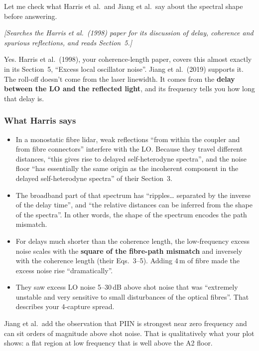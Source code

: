 \begin{tcolorbox}[breakable, colback=gray!4, colframe=gray!50,
	boxrule=0.4pt, arc=2pt, fontupper=\small,
	left=6pt, right=6pt, top=4pt, bottom=4pt]
	Let me check what Harris et al.\ and Jiang et al.\ say about the spectral shape before answering.
	
	\textit{[Searches the Harris et al.\ (1998) paper for its discussion of delay, coherence and spurious reflections, and reads Section~5.]}
	
	Yes. Harris et al.\ (1998), your coherence-length paper, covers this almost exactly in its Section~5, ``Excess local oscillator noise''. Jiang et al.\ (2019) supports it. The roll-off doesn't come from the laser linewidth. It comes from the \textbf{delay between the LO and the reflected light}, and its frequency tells you how long that delay is.
	
	\subsubsection*{What Harris says}
	\begin{itemize}
		\item In a monostatic fibre lidar, weak reflections ``from within the coupler and from fibre connectors'' interfere with the LO. Because they travel different distances, ``this gives rise to delayed self-heterodyne spectra'', and the noise floor ``has essentially the same origin as the incoherent component in the delayed self-heterodyne spectra'' of their Section~3.
		\item The broadband part of that spectrum has ``ripples\ldots{} separated by the inverse of the delay time'', and ``the relative distances can be inferred from the shape of the spectra''. In other words, the shape of the spectrum encodes the path mismatch.
		\item For delays much shorter than the coherence length, the low-frequency excess noise scales with the \textbf{square of the fibre-path mismatch} and inversely with the coherence length (their Eqs.~3--5). Adding 4\,m of fibre made the excess noise rise ``dramatically''.
		\item They saw excess LO noise 5--30\,dB above shot noise that was ``extremely unstable and very sensitive to small disturbances of the optical fibres''. That describes your 4-capture spread.
	\end{itemize}
	
	Jiang et al.\ add the observation that PIIN is strongest near zero frequency and can sit orders of magnitude above shot noise. That is qualitatively what your plot shows: a flat region at low frequency that is well above the A2 floor.
	

\end{tcolorbox}
